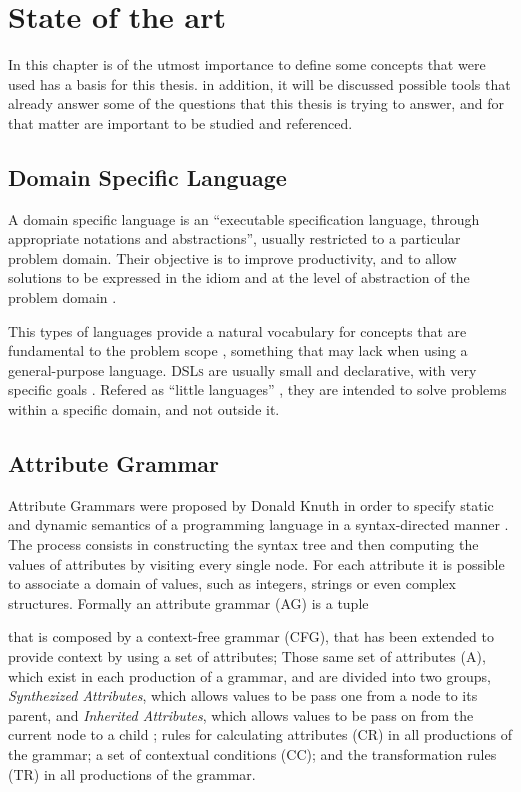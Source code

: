 \chapter{State of the art} \label{state_of_the_art}

In this chapter is of the utmost importance to define some concepts that were used has a basis for this thesis. in addition, it will be discussed possible tools that already answer some of the questions that this thesis is trying to answer, and for that matter are important to be studied and referenced.
	
\section{Domain Specific Language}
A domain specific language is an ``executable specification language, through appropriate notations and abstractions'', usually restricted to a particular problem domain. Their objective is to improve productivity, and to allow solutions to be expressed in the idiom and at the level of abstraction of the problem domain \cite{van_2000}.
	
This types of languages provide a natural vocabulary for concepts that are fundamental to the problem scope \cite{bruce_1997}, something that may lack when using a general-purpose language. \textsc{DSLs} are usually small and declarative, with very specific goals \cite{van_2000}. Refered as ``little languages'' \cite{bentley_1986}, they are intended to solve problems within a specific domain, and not outside it.
	
\section{Attribute Grammar}
Attribute Grammars were proposed by Donald Knuth in order to specify static and dynamic semantics of a programming language in a syntax-directed manner \cite{thirunarayan_2009}. The process consists in constructing the syntax tree and then computing the values of attributes by visiting every single node. For each attribute it is possible to associate a domain of values, such as integers, strings or even complex structures. Formally an attribute grammar (AG) is a tuple \cite{pereira_2016}
	
that is composed by a context-free grammar (CFG), that has been extended to provide context by using a set of attributes; Those same set of attributes (A), which exist in each production of a grammar, and are divided into two groups, \emph{Synthezized Attributes}, which allows values to be pass one from a node to its parent, and \emph{Inherited Attributes}, which allows values to be pass on from the current node to a child \cite{slonneger_1995}; rules for calculating attributes (CR) in all productions of the grammar; a set of contextual conditions (CC); and the transformation rules (TR) in all productions of the grammar.

